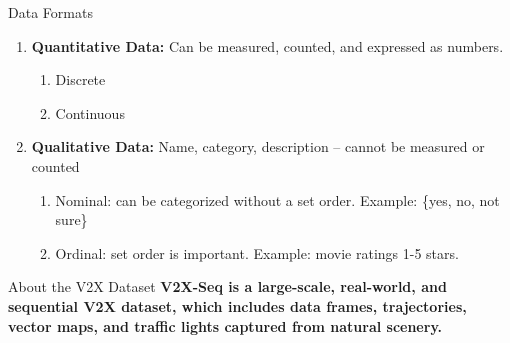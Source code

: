 \documentclass[aspectratio=169,xcolor=dvipsnames,svgnames,x11names,fleqn]{beamer}
\begin{document}
\begin{frame}{Data Formats}
    \begin{enumerate}
        \item \textbf{Quantitative Data:} Can be measured, counted, and expressed as numbers.
        \begin{enumerate}
            \item Discrete
            \item Continuous
        \end{enumerate}
        \item \textbf{Qualitative Data:} Name, category, description -- cannot be measured or counted
        \begin{enumerate}
            \item Nominal: can be categorized without a set order. Example: \{yes, no, not sure\}
            \item Ordinal: set order is important. Example: movie ratings 1-5 stars.
        \end{enumerate}
    \end{enumerate}
\end{frame}



{
%
\begin{frame}{About the V2X Dataset}
\Large
   \textbf{ V2X-Seq is a large-scale, real-world, and sequential V2X dataset, which includes data frames, trajectories, vector maps, and traffic lights captured from natural scenery.}
\end{frame}
}
\end{document}
